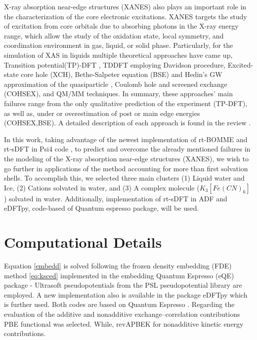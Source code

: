 \documentclass[notitlepage,12pt]{report}
\begin{document}
	X-ray absorption near-edge structures (XANES) also plays an important role in the characterization of the core electronic excitations. XANES targets the study of excitation from core orbitals due to absorbing photons in the X-ray energy range\supercite{fransson2016x}, which allow the study of the oxidation state, local symmetry, and coordination environment in gas, liquid, or solid phase\supercite{rehr2005progress,koningsberger1987x}. 
	Particularly, for the simulation of XAS in liquids multiple theoretical approaches have came up, Transition potential(TP)-DFT \supercite{triguero1998calculations}, TDDFT employing Davidson procedure\supercite{davidson197514}, Excited-state core hole (XCH)\supercite{prendergast2006x}, Bethe-Salpeter equation (BSE) and Hedin's GW approximation of the quasiparticle \supercite{vinson2012theoretical}, Coulomb hole and screened exchange (COHSEX)\supercite{chen2010x}, and QM/MM techniques\supercite{list2014lanczos}. In summary, these approaches' main failures range from the only qualitative prediction of the experiment (TP-DFT), as well as, under or overestimation of post or main edge energies (COHSEX,BSE). A detailed description of each approach is found in the review \cite{fransson2016x}.
	
	In this work, taking advantage of the newest implementation of rt-BOMME and rt-sDFT \supercite{de2021environment} in Psi4 code \supercite{smith2020psi4}, to predict and overcome the already mentioned failures in the modeling of the X-ray absorption near-edge structures (XANES), we wish to go further in applications of the method accounting for more than first solvation shells. To accomplish this, we selected three main clusters (1) Liquid water and Ice, (2) Cations solvated in water, and (3) A complex molecule ($K_3[Fe(CN)_6]$) solvated in water. Additionally, implementation of rt-sDFT in ADF\supercite{te2001chemistry} and eDFTpy\supercite{edftpy}, code-based of Quantum espresso package\supercite{giannozzi2009quantum}, will be used.

\section{Computational Details}

Equation \ref{embedd} is solved following the frozen density embedding (FDE) method \ref{eq:ksced} implemented in the embedding Quantum Espresso (eQE) package \supercite{genova2017eqe}- Ultrasoft pseudopotentials from the PSL pseudopotential library \supercite{corso2014comput} are employed. A new implementation also is available in the package eDFTpy\supercite{edftpy} which is further used. Both codes are based on Quantum Espresso \supercite{qe}. Regarding the evaluation of the additive and nonadditive exchange--correlation contributions PBE functional \supercite{perdew1996phys} was selected. While, revAPBEK \supercite{laricchia2011generalized} for nonadditive kinetic energy contributions. 
\end{document}
